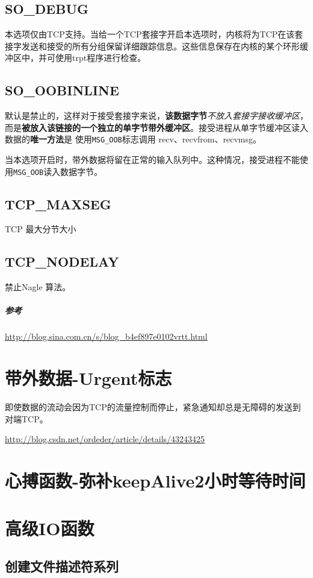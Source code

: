 \documentclass[UTF8,a4paper,8pt]{ctexbook}
\begin{document}
		\subsection{SO\_DEBUG}
			本选项仅由TCP支持。当给一个TCP套接字开启本选项时，内核将为TCP在该套接字发送和接受的所有分组保留详细跟踪信息。这些信息保存在内核的某个环形缓冲区中，并可使用trpt程序进行检查。
		
		\subsection{SO\_OOBINLINE}
			默认是禁止的，这样对于接受套接字来说，\textbf{该数据字节}\textit{不放入套接字接收缓冲区}，而是\textbf{被放入该链接的一个独立的单字节带外缓冲区}。接受进程从单字节缓冲区读入数据的\textbf{唯一方法}是  使用\verb|MSG_OOB|标志调用 recv、recvfrom、recvmsg。
			
			当本选项开启时，带外数据将留在正常的输入队列中。这种情况，接受进程不能使用\verb|MSG_OOB|读入数据字节。	
			
		\subsection{TCP\_MAXSEG}	
			TCP 最大分节大小
		
		\subsection{TCP\_NODELAY}
			禁止Nagle 算法。
			
		\subparagraph{参考}\url{http://blog.sina.com.cn/s/blog_b4ef897e0102vrtt.html}
	
	\section{带外数据-Urgent标志}
		即使数据的流动会因为TCP的流量控制而停止，紧急通知却总是无障碍的发送到对端TCP。
	
		\url{http://blog.csdn.net/ordeder/article/details/43243425}
	\section{心搏函数-弥补keepAlive2小时等待时间}	
			
	\section{高级IO函数}
		\subsection{创建文件描述符系列}
\end{document}
